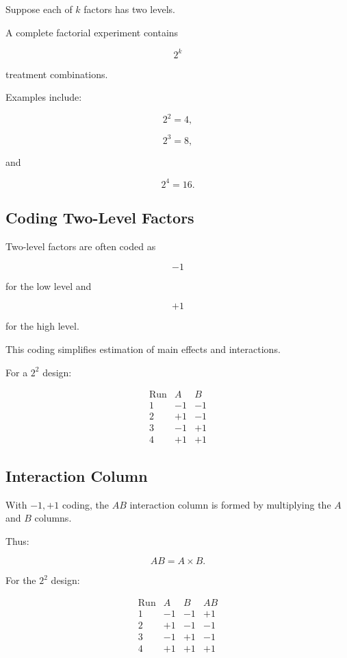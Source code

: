 Suppose each of \(k\) factors has two levels.

A complete factorial experiment contains

\[
\boxed{
2^k
}
\]

treatment combinations.

Examples include:

\[
2^2=4,
\]

\[
2^3=8,
\]

and

\[
2^4=16.
\]

\subsection{Coding Two-Level Factors}
\label{subsec:coding-two-level-factors}

Two-level factors are often coded as

\[
\boxed{
-1
}
\]

for the low level and

\[
\boxed{
+1
}
\]

for the high level.

This coding simplifies estimation of main effects and interactions.

For a \(2^2\) design:

\[
\begin{array}{c|cc}
\text{Run}
&
A
&
B
\\
\hline
1&-1&-1\\
2&+1&-1\\
3&-1&+1\\
4&+1&+1
\end{array}
\]

\subsection{Interaction Column}
\label{subsec:factorial-interaction-column}

With \(-1,+1\) coding, the \(AB\) interaction column is formed by
multiplying the \(A\) and \(B\) columns.

Thus:

\[
\boxed{
AB=A\times B.
}
\]

For the \(2^2\) design:

\[
\begin{array}{c|ccc}
\text{Run}
&A&B&AB\\
\hline
1&-1&-1&+1\\
2&+1&-1&-1\\
3&-1&+1&-1\\
4&+1&+1&+1
\end{array}
\]

